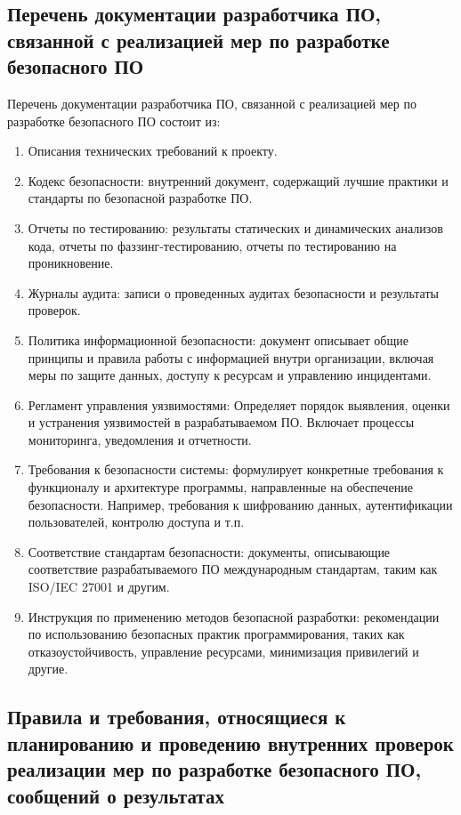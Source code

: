 \subsection{Перечень документации разработчика ПО, связанной с реализацией мер по разработке безопасного ПО}

Перечень документации разработчика ПО, связанной с реализацией мер по разработке безопасного ПО состоит из:

\begin{enumerate}
    \item Описания технических требований к проекту.
    \item Кодекс безопасности: внутренний документ, содержащий лучшие практики и стандарты по безопасной разработке ПО.
    \item Отчеты по тестированию: результаты статических и динамических анализов кода, отчеты по фаззинг-тестированию, отчеты по тестированию на проникновение.
    \item Журналы аудита: записи о проведенных аудитах безопасности и результаты проверок.
    \item Политика информационной безопасности: документ описывает общие принципы и правила работы с информацией внутри организации, включая меры по защите данных, доступу к ресурсам и управлению инцидентами.
    \item Регламент управления уязвимостями: Определяет порядок выявления, оценки и устранения уязвимостей в разрабатываемом ПО. Включает процессы мониторинга, уведомления и отчетности.
    \item Требования к безопасности системы: формулирует конкретные требования к функционалу и архитектуре программы, направленные на обеспечение безопасности. Например, требования к шифрованию данных, аутентификации пользователей, контролю доступа и т.п.
    \item Соответствие стандартам безопасности: документы, описывающие соответствие разрабатываемого ПО международным стандартам, таким как ISO/IEC 27001 и другим.
    \item Инструкция по применению методов безопасной разработки: рекомендации по использованию безопасных практик программирования, таких как отказоустойчивость, управление ресурсами, минимизация привилегий и другие.
\end{enumerate}

\subsection{Правила и требования, относящиеся к планированию и проведению внутренних проверок реализации мер по разработке безопасного ПО, сообщений о результатах}

